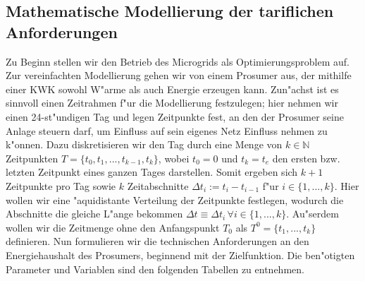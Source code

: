 \subsection{Mathematische Modellierung der tariflichen Anforderungen}
Zu Beginn stellen wir den Betrieb des Microgrids als Optimierungsproblem auf. Zur vereinfachten Modellierung gehen wir von einem Prosumer aus, der mithilfe einer KWK sowohl W"arme als auch Energie erzeugen kann. Zun"achst ist es sinnvoll einen Zeitrahmen f"ur die Modellierung festzulegen; hier nehmen wir einen 24-st"undigen Tag und legen Zeitpunkte fest, an den der Prosumer seine Anlage steuern darf, um Einfluss auf sein eigenes Netz Einfluss nehmen zu k"onnen. 
Dazu diskretisieren wir den Tag durch eine Menge von $k \in \mathbb{N}$ Zeitpunkten $T=\{t_0, t_1,...,t_{k-1},t_k\}$, wobei $t_0=0$ und $t_k=t_e$ den ersten bzw. letzten Zeitpunkt eines ganzen Tages darstellen. Somit ergeben sich $k+1$ Zeitpunkte pro Tag sowie $k$ Zeitabschnitte $\Delta t_i:= t_i - t_{i-1}$ f"ur $i \in \{1,...,k\}$. Hier wollen wir eine "aquidistante Verteilung der Zeitpunkte festlegen, wodurch die Abschnitte die gleiche L"ange bekommen $\Delta t \equiv \Delta t_i \, \forall i \in \{1,...,k\}$. Au"serdem wollen wir die Zeitmenge ohne den Anfangspunkt $T_0$ als $T^0=\{t_1,...,t_k\}$ definieren. 
Nun formulieren wir die technischen Anforderungen an den Energiehaushalt des Prosumers, beginnend mit der Zielfunktion. Die ben"otigten Parameter und Variablen sind den folgenden Tabellen zu entnehmen.

